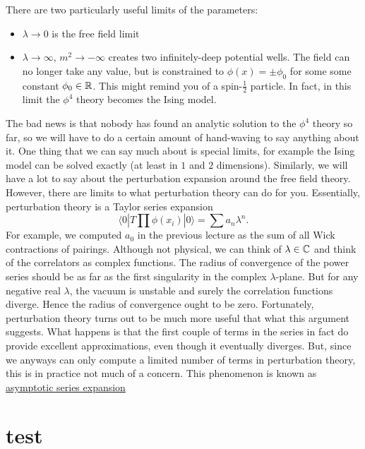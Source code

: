 \documentclass[12pt]{article}
\begin{document}
There are two particularly useful limits of the parameters:
\begin{itemize}
\item $\lambda\to 0$ is the free field limit
\item $\lambda\to \infty$, $m^2\to -\infty$ creates two
  infinitely-deep potential wells. The field can no longer take any
  value, but is constrained to $\phi(x) = \pm \phi_0$ for some some
  constant $\phi_0\in{\mathbb{R}}$. This might remind you of a
  spin-$\tfrac{1}{2}$ particle. In fact, in this limit the $\phi^4$
  theory becomes the Ising model.
\end{itemize}
The bad news is that nobody has found an analytic solution to the
$\phi^4$ theory so far, so we will have to do a certain amount of
hand-waving to say anything about it. One thing that we can say much
about is special limits, for example the Ising model can be solved
exactly (at least in $1$ and $2$ dimensions). Similarly, we will have
a lot to say about the perturbation expansion around the free field
theory. However, there are limits to what perturbation theory can do
for you. Essentially, perturbation theory is a Taylor series expansion
\begin{equation}
  \langle 0|T\prod \phi(x_i)|0\rangle =
  \sum a_n \lambda^n.
\end{equation}
For example, we computed $a_0$ in the previous lecture as the sum of
all Wick contractions of pairings. Although not physical, we can think
of $\lambda \in {\mathbb{C}}$ and think of the correlators as complex
functions. The radius of convergence of the power series should be as
far as the first singularity in the complex $\lambda$-plane. But for
any negative real $\lambda$, the vacuum is unstable and surely the
correlation functions diverge. Hence the radius of convergence ought
to be zero. Fortunately, perturbation theory turns out to be much more
useful that what this argument suggests. What happens is that the
first couple of terms in the series in fact do provide excellent
approximations, even though it eventually diverges. But, since we
anyways can only compute a limited number of terms in perturbation
theory, this is in practice not much of a concern. This phenomenon is
known as
\href{http://en.wikipedia.org/wiki/Asymptotic_expansion}{asymptotic
  series expansion}





\newpage
\appendixm

\section{test}



 
\renewcommand{\refname}{Bibliography}

\end{document}
